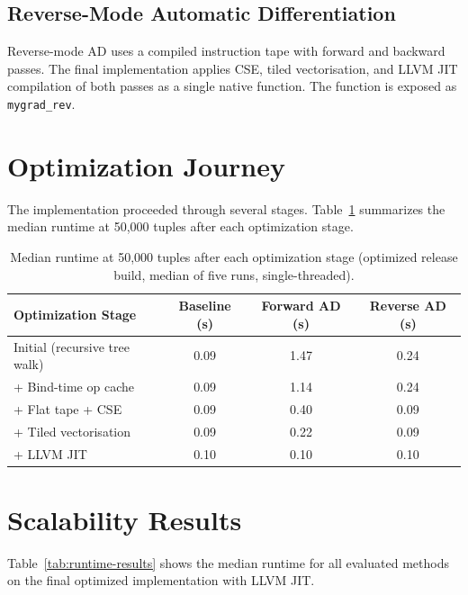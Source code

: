 \documentclass[12pt]{report}
\begin{document}
\subsection{Reverse-Mode Automatic Differentiation}

Reverse-mode AD uses a compiled instruction tape with forward and backward
passes. The final implementation applies CSE, tiled vectorisation, and LLVM
JIT compilation of both passes as a single native function. The function is
exposed as \texttt{mygrad\_rev}.

\section{Optimization Journey}

The implementation proceeded through several stages. Table~\ref{tab:opt-journey}
summarizes the median runtime at 50{,}000 tuples after each optimization stage.

\begin{table}[H]
\centering
\begin{tabular}{|l|c|c|c|}
\hline
Optimization Stage & Baseline (s) & Forward AD (s) & Reverse AD (s) \\
\hline
Initial (recursive tree walk) & 0.09 & 1.47 & 0.24 \\
+ Bind-time op cache & 0.09 & 1.14 & 0.24 \\
+ Flat tape + CSE & 0.09 & 0.40 & 0.09 \\
+ Tiled vectorisation & 0.09 & 0.22 & 0.09 \\
+ LLVM JIT & 0.10 & 0.10 & 0.10 \\
\hline
\end{tabular}
\caption{Median runtime at 50{,}000 tuples after each optimization stage
(optimized release build, median of five runs, single-threaded).}
\label{tab:opt-journey}
\end{table}

\section{Scalability Results}

Table~\ref{tab:runtime-results} shows the median runtime for all evaluated
methods on the final optimized implementation with LLVM JIT.
\end{document}
